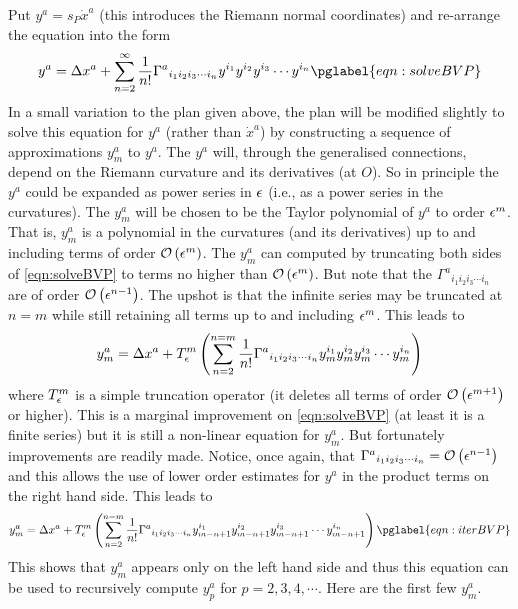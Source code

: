 \documentclass[a4paper,12pt]{article}
\numberwithin{equation}{section}
\begin{document}
Put $y^a = s_P {\Dot x}^a$ (this introduces the Riemann normal coordinates) and re-arrange
the equation into the form
\begin{equation}
y^a = \Delta x^a + \sum_{n=2}^\infty \frac{1}{n!}\Gamma^{a}{}_{i_1i_2i_3\cdots i_n}
                   y^{i_1} y^{i_2} y^{i_3}\cdots y^{i_n}
\pglabel{eqn:solveBVP}
\end{equation}
In a small variation to the plan given above, the plan will be modified slightly to solve
this equation for $y^a$ (rather than ${\Dot x}^a$) by constructing a sequence of
approximations $y^a_m$ to $y^a$. The $y^a$ will, through the generalised connections, depend
on the Riemann curvature and its derivatives (at $O$). So in principle the $y^a$ could be
expanded as power series in $\epsilon$ (i.e., as a power series in the curvatures). The $y^a_m$
will be chosen to be the Taylor polynomial of $y^a$ to order $\epsilon^m$. That is, $y^a_m$ is a
polynomial in the curvatures (and its derivatives) up to and including terms of order
$\mathcal{O}\left(\epsilon^m\right)$. The $y^a_m$ can computed by truncating both sides of \eqref{eqn:solveBVP}
to terms no higher than $\mathcal{O}\left(\epsilon^m\right)$. But note that the $\Gamma^{a}{}_{i_1i_2i_3\cdots
i_n}$ are of order $\mathcal{O}\left(\epsilon^{n-1}\right)$. The upshot is that the infinite series may be
truncated at $n=m$ while still retaining all terms up to and including $\epsilon^m$. This leads
to
\[
y^a_m = \Delta x^a
      + T^m_{\epsilon}\left(
             \sum_{n=2}^{n=m} \frac{1}{n!}\Gamma^{a}{}_{i_1i_2i_3\cdots i_n}
                  y^{i_1}_m y^{i_2}_m y^{i_3}_m\cdots y^{i_n}_m
                  \right)
\]
where $T^m_{\epsilon}$ is a simple truncation operator (it deletes all terms of order
$\mathcal{O}\left(\epsilon^{m+1}\right)$ or higher). This is a marginal improvement on \eqref{eqn:solveBVP} (at
least it is a finite series) but it is still a non-linear equation for $y^a_m$. But
fortunately improvements are readily made. Notice, once again, that
$\Gamma^{a}{}_{i_1i_2i_3\cdots i_n} = \mathcal{O}\left(\epsilon^{n-1}\right)$ and this allows the use of lower
order estimates for $y^a$ in the product terms on the right hand side. This leads to
\begin{equation}
y^a_m = \Delta x^a
      + T^m_{\eps}\left(
             \sum_{n=2}^{n=m} \frac{1}{n!}\Gamma^{a}{}_{i_1i_2i_3\cdots i_n}
                  y^{i_1}_{m-n+1} y^{i_2}_{m-n+1} y^{i_3}_{m-n+1}\cdots y^{i_n}_{m-n+1}
                  \right)
\pglabel{eqn:iterBVP}
\end{equation}
This shows that $y^a_m$ appears only on the left hand side and thus this equation can be
used to recursively compute $y^a_p$ for $p=2,3,4,\cdots$. Here are the first few $y^a_m$.
\end{document}
